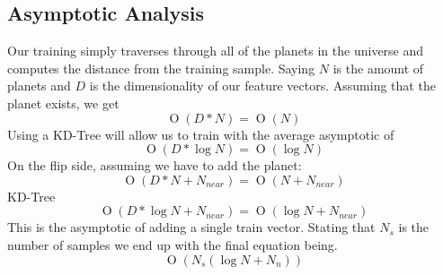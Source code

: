 \documentclass[journal]{IEEEtran}
\newcommand{\BigO}[1]{\ensuremath{\operatorname{O}\left(#1\right)}}
\begin{document}
\subsection{Asymptotic Analysis}
Our training simply traverses through all of the planets in the universe and computes the distance from the training sample. Saying $N$ is the amount of planets and $D$ is the dimensionality of our feature vectors. Assuming that the planet exists, we get
\begin{equation}
\BigO{D*N} = \BigO{N}
\end{equation}
Using a KD-Tree 
\citep{kdtree} will allow us to train with the average asymptotic of 
\begin{equation}
\BigO{D*\log{N}} = \BigO{\log{N}} 
\end{equation}
On the flip side, assuming we have to add the planet:
\begin{equation}
\BigO{D*N + N_{near}} = \BigO{N + N_{near}}
\end{equation}
KD-Tree \citep{kdtree}
\begin{equation}
\BigO{D*\log{N} + N_{near}} = \BigO{\log{N} + N_{near}} 
\end{equation}
This is the asymptotic of adding a single train vector. Stating that $N_s$ is the number of samples we end up with the final equation being.
\begin{equation}
\BigO{N_s(\log{N} + N_{n})}
\end{equation}
\end{document}
